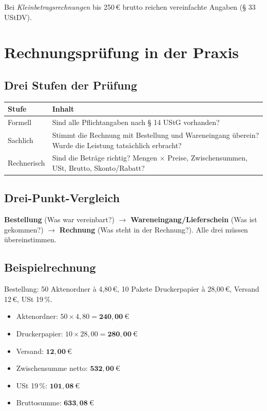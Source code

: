 \documentclass[11pt, a4paper]{article}
\begin{document}
Bei \emph{Kleinbetragsrechnungen} bis 250\,€ brutto reichen vereinfachte Angaben
(§ 33 UStDV).

\section{Rechnungsprüfung in der Praxis}

\subsection{Drei Stufen der Prüfung}

\begin{center}
\begin{tabular}{p{3.5cm} p{10.5cm}}
\toprule
\textbf{Stufe} & \textbf{Inhalt}\\
\midrule
Formell & Sind alle Pflichtangaben nach § 14 UStG vorhanden?\\
Sachlich & Stimmt die Rechnung mit Bestellung und Wareneingang überein? Wurde die Leistung tatsächlich erbracht?\\
Rechnerisch & Sind die Beträge richtig? Mengen $\times$ Preise, Zwischensummen, USt, Brutto, Skonto/Rabatt?\\
\bottomrule
\end{tabular}
\end{center}

\subsection{Drei-Punkt-Vergleich}

\begin{merksatz}[title={Drei-Punkt-Vergleich}]
\textbf{Bestellung} (Was war vereinbart?) $\to$ \textbf{Wareneingang/Lieferschein} (Was ist gekommen?) $\to$ \textbf{Rechnung} (Was steht in der Rechnung?). Alle drei müssen übereinstimmen.
\end{merksatz}

\subsection{Beispielrechnung}

\begin{beispiel}
Bestellung: 50 Aktenordner à 4,80\,€, 10 Pakete Druckerpapier à 28,00\,€, Versand 12\,€, USt 19\,\%.

\begin{itemize}[itemsep=0pt]
  \item Aktenordner: $50 \times 4{,}80 = \mathbf{240{,}00~€}$
  \item Druckerpapier: $10 \times 28{,}00 = \mathbf{280{,}00~€}$
  \item Versand: $\mathbf{12{,}00~€}$
  \item Zwischensumme netto: $\mathbf{532{,}00~€}$
  \item USt 19\,\%: $\mathbf{101{,}08~€}$
  \item Bruttosumme: $\mathbf{633{,}08~€}$
\end{itemize}
\end{beispiel}
\end{document}
